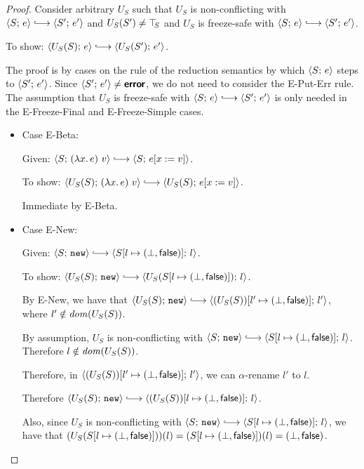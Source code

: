 \begin{proof}
  Consider arbitrary $U_S$ such that $U_S$ is non-conflicting with
  $\config{S}{e} \parstepsto \config{S'}{e'}$ and $U_S(S') \neq \top\hspace{-0.85mm}_{S}$
  and $U_S$ is freeze-safe with $\config{S}{e} \parstepsto
  \config{S'}{e'}$.

  To show: $\config{U_S(S)}{e} \parstepsto \config{U_S(S')}{e'}$.

  The proof is by cases on the rule of the reduction semantics by
  which $\langle S;\, e \rangle$ steps to $\langle S';\, e' \rangle$.  Since
  $\langle S';\, e' \rangle \neq \textbf{\textsf{error}}$, we do not need to consider the {\sc
    E-Put-Err} rule.  The assumption that $U_S$ is freeze-safe with
  $\config{S}{e} \parstepsto \config{S'}{e'}$ is only needed in the
  {\sc E-Freeze-Final} and {\sc E-Freeze-Simple} cases.

  \begin{itemize}

    \item Case {\sc E-Beta}:

      Given: $\config{S}{\app{(\lam{x}{e})}{v}} \parstepsto
      \config{S}{\subst{e}{x}{v}}$.

      To show: $\config{U_S(S)}{\app{(\lam{x}{e})}{v}} \parstepsto
      \config{U_S(S)}{\subst{e}{x}{v}}$.

      Immediate by {\sc E-Beta}.

    \item Case {\sc E-New}:

      Given: $\config{S}{\NEW} \parstepsto
      \config{\extS{S}{l}{\bot}{\frozenfalse}}{l}$.

      To show: $\config{U_S(S)}{\NEW} \parstepsto
      \config{U_S(\extS{S}{l}{\bot}{\frozenfalse})}{l}$.

      By {\sc E-New}, we have that $\config{U_S(S)}{\NEW} \parstepsto
      \config{\extS{(U_S(S))}{l'}{\bot}{\frozenfalse}}{l'}$, where $l'
      \notin \mathit{dom}(U_S(S))$.

      By assumption, $U_S$ is non-conflicting with $\config{S}{\NEW}
      \parstepsto \config{\extS{S}{l}{\bot}{\frozenfalse}}{l}$.
      Therefore $l \notin \mathit{dom}(U_S(S))$.

      Therefore, in
      $\langle (U_S(S))[l' \mapsto (\bot, \textsf{false})];\, l' \rangle$, we
      can $\alpha$-rename $l'$ to $l$.

      Therefore $\config{U_S(S)}{\NEW} \parstepsto
      \config{\extS{(U_S(S))}{l}{\bot}{\frozenfalse}}{l}$.

      Also, since $U_S$ is non-conflicting with $\config{S}{\NEW}
      \parstepsto \config{\extS{S}{l}{\bot}{\frozenfalse}}{l}$, we
      have that $(U_S(S[l \mapsto (\bot, \textsf{false})]))(l) =
      (S[l \mapsto (\bot, \textsf{false})])(l) =
      (\bot, \textsf{false})$.


\end{itemize}
\end{proof}
